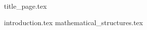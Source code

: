 \documentclass{article}
\begin{document}
  \onehalfspacing
  \setlength{\parskip}{1.5em} 


  {title_page.tex}


  \tableofcontents

  \newpage


  {introduction.tex}
  {mathematical_structures.tex}
\end{document}
